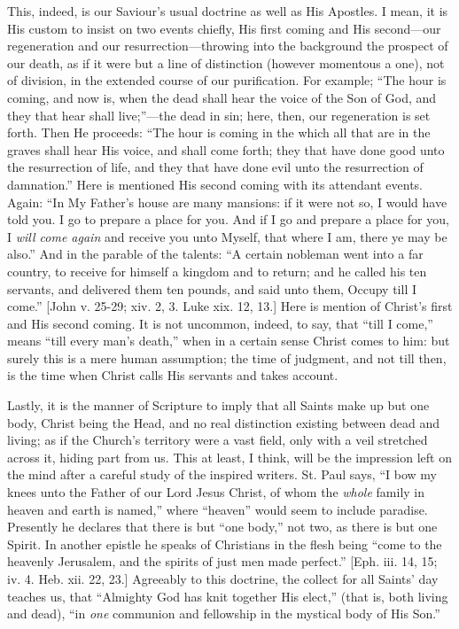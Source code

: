 This, indeed, is our Saviour's usual doctrine as well as His
Apostles. I mean, it is His custom to insist on two events chiefly,
His first coming and His second—our regeneration and our
resurrection—throwing into the background the prospect of our death,
as if it were but a line of distinction (however momentous a one), not
of division, in the extended course of our purification. For example;
``The hour is coming, and now is, when the dead shall hear the
voice of the Son of God, and they that hear shall live;''—the
dead in sin; here, then, our regeneration is set forth. Then He
proceeds: ``The hour is coming in the which all that are in the
graves shall hear His voice, and shall come forth; they that have done
good unto the resurrection of life, and they that have done evil unto
the resurrection of damnation.'' Here is mentioned His second
coming with its attendant events. Again: ``In My Father's house
are many mansions: if it were not so, I would have told you. I go to
prepare a place for you. And if I go and prepare a place for you, I \emph{will
come again} and receive you unto Myself, that where I am, there ye
may be also.'' And in the parable of the talents: ``A certain
nobleman went into a far country, to receive for himself a kingdom and
to return; and he called his ten servants, and delivered them ten
pounds, and said unto them, Occupy till I come.'' [John v. 25-29;
xiv. 2, 3. Luke xix. 12, 13.] Here is mention of Christ's first and
His second coming. It is not uncommon, indeed, to say, that ``till
I come,'' means ``till every man's death,'' when in a
certain sense Christ comes to him: but surely this is a mere human
assumption; the time of judgment, and not till then, is the time when
Christ calls His servants and takes account.

Lastly, it is the manner of Scripture to imply that all Saints make
up but one body, Christ being the Head, and no real distinction
existing between dead and living; as if the Church's territory were a
vast field, only with a veil stretched across it, hiding part from us.
This at least, I think, will be the impression left on the mind after
a careful study of the inspired writers. St. Paul says, ``I bow my
knees unto the Father of our Lord Jesus Christ, of whom the \emph{whole}
family in heaven and earth is named,'' where ``heaven''
would seem to include paradise. Presently he declares that there is
but ``one body,'' not two, as there is but one Spirit. In
another epistle he speaks of Christians in the flesh being ``come
to the heavenly Jerusalem, and the spirits of just men made
perfect.'' [Eph. iii. 14, 15; iv. 4. Heb. xii. 22, 23.] Agreeably
to this doctrine, the collect for all Saints' day teaches us, that
``Almighty God has knit together His elect,'' (that is, both
living and dead), ``in \emph{one} communion and fellowship in the
mystical body of His Son.''

